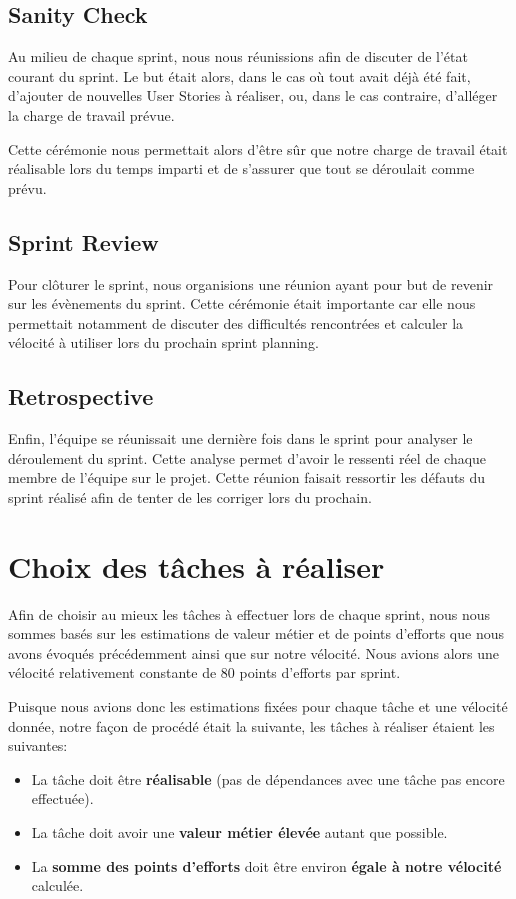 \documentclass[11pt]{report}
\begin{document}
\subsection{Sanity Check}

Au milieu de chaque sprint, nous nous réunissions afin de discuter de l'état courant du sprint. Le but était alors, dans le cas
où tout avait déjà été fait, d'ajouter de nouvelles User Stories à réaliser, ou, dans le cas contraire, d'alléger la charge
de travail prévue.

Cette cérémonie nous permettait alors d'être sûr que notre charge de travail était réalisable lors du temps imparti
et de s'assurer que tout se déroulait comme prévu.

\subsection{Sprint Review}

Pour clôturer le sprint, nous organisions une réunion ayant pour but de revenir sur les évènements du sprint.
Cette cérémonie était importante car elle nous permettait notamment de discuter des difficultés rencontrées et calculer la vélocité 
à utiliser lors du prochain sprint planning.

\subsection{Retrospective}

Enfin, l'équipe se réunissait une dernière fois dans le sprint pour analyser le déroulement du sprint. Cette analyse permet d'avoir le ressenti réel de chaque membre de l'équipe sur le projet. Cette réunion faisait ressortir les défauts du sprint réalisé afin de tenter de les corriger lors du prochain.

\section{Choix des tâches à réaliser}

Afin de choisir au mieux les tâches à effectuer lors de chaque sprint, nous nous sommes basés sur les estimations de valeur métier et de points d'efforts que nous avons évoqués précédemment ainsi que sur notre vélocité. Nous avions alors une vélocité relativement constante de 80 points d'efforts par sprint.\newline

Puisque nous avions donc les estimations fixées pour chaque tâche et une vélocité donnée, notre façon de procédé était la suivante, les tâches à réaliser étaient les suivantes:
\begin{itemize}
  \item La tâche doit être \textbf{réalisable} (pas de dépendances avec une tâche pas encore effectuée).
  \item La tâche doit avoir une \textbf{valeur métier élevée} autant que possible.
  \item La \textbf{somme des points d'efforts} doit être environ \textbf{égale à notre vélocité} calculée.\newline
\end{itemize}
\end{document}
